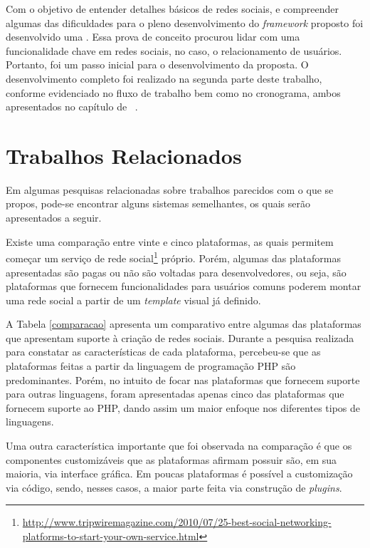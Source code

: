 Com o objetivo de entender detalhes básicos de redes sociais, e compreender algumas das dificuldades para o pleno desenvolvimento do \textit{framework} proposto foi desenvolvido uma . Essa prova de conceito procurou lidar com uma funcionalidade chave em redes sociais, no caso, o relacionamento de usuários. Portanto, foi um passo inicial para o desenvolvimento da proposta. O desenvolvimento completo foi realizado na segunda parte deste trabalho, conforme evidenciado no fluxo de trabalho bem como no cronograma, ambos apresentados no capítulo de ~.

\section{Trabalhos Relacionados}

Em algumas pesquisas relacionadas sobre trabalhos parecidos com o que se propos, pode-se encontrar alguns sistemas semelhantes, os quais serão apresentados a seguir.

Existe uma comparação entre vinte e cinco plataformas, as quais permitem começar um serviço de rede social\footnote{\url{http://www.tripwiremagazine.com/2010/07/25-best-social-networking-platforms-to-start-your-own-service.html}}  próprio. Porém, algumas das plataformas apresentadas são pagas ou não são voltadas para desenvolvedores, ou seja, são plataformas que fornecem funcionalidades para usuários comuns poderem montar uma rede social a partir de um \textit{template} visual já definido.

A Tabela \ref{comparacao} apresenta um comparativo entre algumas das plataformas que apresentam suporte à criação de redes sociais. Durante a pesquisa realizada para constatar as características de cada plataforma, percebeu-se que as plataformas feitas a partir da linguagem de programação PHP são predominantes. Porém, no intuito de focar nas plataformas que fornecem suporte para outras linguagens, foram apresentadas apenas cinco das plataformas que fornecem suporte ao PHP, dando assim um maior enfoque nos diferentes tipos de linguagens.

Uma outra característica importante que foi observada na comparação é que os componentes customizáveis que as plataformas afirmam possuir são, em sua maioria, via interface gráfica. Em poucas plataformas é possível a customização via código, sendo, nesses casos, a maior parte feita via construção de \textit{plugins}.

\newpage


